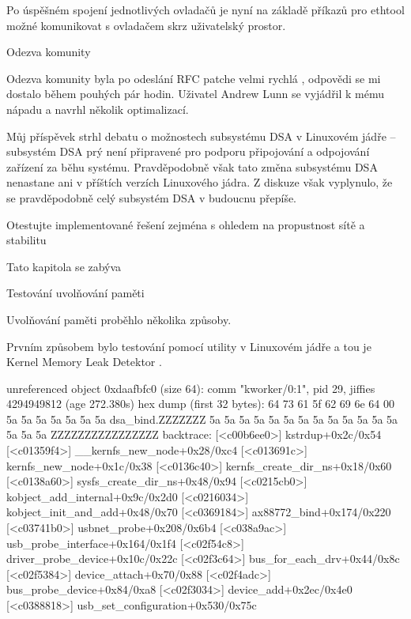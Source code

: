 Po úspěšném spojení jednotlivých ovladačů je nyní na základě příkazů pro ethtool možné komunikovat s ovladačem skrz uživatelský prostor.

\sec Odezva komunity

Odezva komunity byla po odeslání RFC patche velmi rychlá
,
odpovědi se mi dostalo během pouhých pár hodin.
Uživatel Andrew Lunn se vyjádřil k mému nápadu a navrhl několik optimalizací. %

Můj příspěvek strhl debatu o možnostech subsystému DSA v Linuxovém jádře -- subsystém DSA prý není připravené pro podporu připojování a odpojování zařízení za běhu systému.
Pravděpodobně však tato změna subsystému DSA nenastane ani v příštích verzích Linuxového jádra.
Z diskuze však vyplynulo, že se pravděpodobně celý subsystém DSA v budoucnu přepíše.

\chap Otestujte implementované řešení zejména s ohledem na propustnost sítě a stabilitu

Tato kapitola se zabýva

\sec Testování uvolňování paměti

Uvolňování paměti proběhlo několika způsoby.

Prvním způsobem bylo testování pomocí utility v Linuxovém jádře a tou je Kernel Memory Leak Detektor
.

\begtt
unreferenced object 0xdaafbfc0 (size 64):
  comm "kworker/0:1", pid 29, jiffies 4294949812 (age 272.380s)
  hex dump (first 32 bytes):
    64 73 61 5f 62 69 6e 64 00 5a 5a 5a 5a 5a 5a 5a  dsa_bind.ZZZZZZZ
    5a 5a 5a 5a 5a 5a 5a 5a 5a 5a 5a 5a 5a 5a 5a 5a  ZZZZZZZZZZZZZZZZ
  backtrace:
    [<c00b6ee0>] kstrdup+0x2c/0x54
    [<c01359f4>] __kernfs_new_node+0x28/0xc4
    [<c013691c>] kernfs_new_node+0x1c/0x38
    [<c0136c40>] kernfs_create_dir_ns+0x18/0x60
    [<c0138a60>] sysfs_create_dir_ns+0x48/0x94
    [<c0215cb0>] kobject_add_internal+0x9c/0x2d0
    [<c0216034>] kobject_init_and_add+0x48/0x70
    [<c0369184>] ax88772_bind+0x174/0x220
    [<c03741b0>] usbnet_probe+0x208/0x6b4
    [<c038a9ac>] usb_probe_interface+0x164/0x1f4
    [<c02f54c8>] driver_probe_device+0x10c/0x22c
    [<c02f3c64>] bus_for_each_drv+0x44/0x8c
    [<c02f5384>] device_attach+0x70/0x88
    [<c02f4adc>] bus_probe_device+0x84/0xa8
    [<c02f3034>] device_add+0x2ec/0x4e0
    [<c0388818>] usb_set_configuration+0x530/0x75c
\endtt

